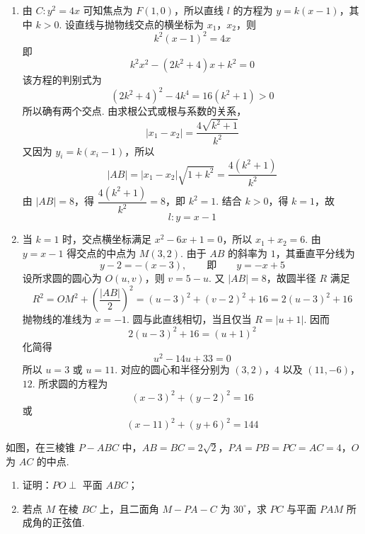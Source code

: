 \begin{solution}
\begin{enumerate}
\item 由 \(C:y^2=4x\) 可知焦点为 \(F(1,0)\)，所以直线 \(l\) 的方程为
\(y=k(x-1)\)，其中 \(k>0\). 设直线与抛物线交点的横坐标为 \(x_1\)，\(x_2\)，则
\[
k^2(x-1)^2=4x
\]
即
\[
k^2x^2-(2k^2+4)x+k^2=0
\]
该方程的判别式为
\[
(2k^2+4)^2-4k^4=16(k^2+1)>0
\]
所以确有两个交点. 由求根公式或根与系数的关系，
\[
|x_1-x_2|=\frac{4\sqrt{k^2+1}}{k^2}
\]
又因为 \(y_i=k(x_i-1)\)，所以
\[
|AB|=|x_1-x_2|\sqrt{1+k^2}
=\frac{4(k^2+1)}{k^2}
\]
由 \(|AB|=8\)，得
\(\dfrac{4(k^2+1)}{k^2}=8\)，即 \(k^2=1\). 结合 \(k>0\)，得 \(k=1\)，故
\[
l:y=x-1
\]
\item 当 \(k=1\) 时，交点横坐标满足 \(x^2-6x+1=0\)，所以
\(x_1+x_2=6\). 由 \(y=x-1\) 得交点的中点为
\(M(3,2)\). 由于 \(AB\) 的斜率为 \(1\)，其垂直平分线为
\[
y-2=-(x-3),\qquad\text{即}\qquad y=-x+5
\]
设所求圆的圆心为 \(O(u,v)\)，则 \(v=5-u\). 又
\(|AB|=8\)，故圆半径 \(R\) 满足
\[
R^2=OM^2+\left(\frac{|AB|}{2}\right)^2
=(u-3)^2+(v-2)^2+16
=2(u-3)^2+16
\]
抛物线的准线为 \(x=-1\). 圆与此直线相切，当且仅当
\(R=|u+1|\). 因而
\[
2(u-3)^2+16=(u+1)^2
\]
化简得
\[
u^2-14u+33=0
\]
所以 \(u=3\) 或 \(u=11\). 对应的圆心和半径分别为
\((3,2)\)，\(4\) 以及 \((11,-6)\)，\(12\). 所求圆的方程为
\[
(x-3)^2+(y-2)^2=16
\]
或
\[
(x-11)^2+(y+6)^2=144
\]
\end{enumerate}
\end{solution}

\begin{problem}
如图，在三棱锥 \(P-ABC\) 中，\(AB=BC=2\sqrt2\)，\(PA=PB=PC=AC=4\)，\(O\) 为 \(AC\) 的中点.

\begin{enumerate}
\item 证明：\(PO\perp\) 平面 \(ABC\)；
\item 若点 \(M\) 在棱 \(BC\) 上，且二面角 \(M-PA-C\) 为 \(30^\circ\)，求 \(PC\) 与平面 \(PAM\) 所成角的正弦值.
\end{enumerate}

\end{problem}


